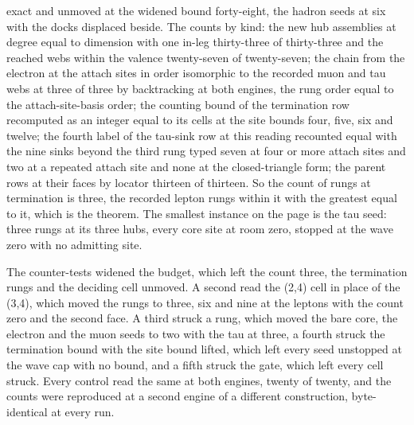 \begin{chproof}
\begin{equation}
\end{equation}
exact and unmoved at the widened bound forty-eight, the hadron seeds at six with the docks displaced beside. The counts by kind: the new hub assemblies at degree equal to dimension with one in-leg thirty-three of thirty-three and the reached webs within the valence twenty-seven of twenty-seven; the chain from the electron at the attach sites in order isomorphic to the recorded muon and tau webs at three of three by backtracking at both engines, the rung order equal to the attach-site-basis order; the counting bound of the termination row recomputed as an integer equal to its cells at the site bounds four, five, six and twelve; the fourth label of the tau-sink row at this reading recounted equal with the nine sinks beyond the third rung typed seven at four or more attach sites and two at a repeated attach site and none at the closed-triangle form; the parent rows at their faces by locator thirteen of thirteen. So the count of rungs at termination is three, the recorded lepton rungs within it with the greatest equal to it, which is the theorem. The smallest instance on the page is the tau seed: three rungs at its three hubs, every core site at room zero, stopped at the wave zero with no admitting site.

The counter-tests widened the budget, which left the count three, the termination rungs and the deciding cell unmoved. A second read the (2,4) cell in place of the (3,4), which moved the rungs to three, six and nine at the leptons with the count zero and the second face. A third struck a rung, which moved the bare core, the electron and the muon seeds to two with the tau at three, a fourth struck the termination bound with the site bound lifted, which left every seed unstopped at the wave cap with no bound, and a fifth struck the gate, which left every cell struck. Every control read the same at both engines, twenty of twenty, and the counts were reproduced at a second engine of a different construction, byte-identical at every run.
\end{chproof}
